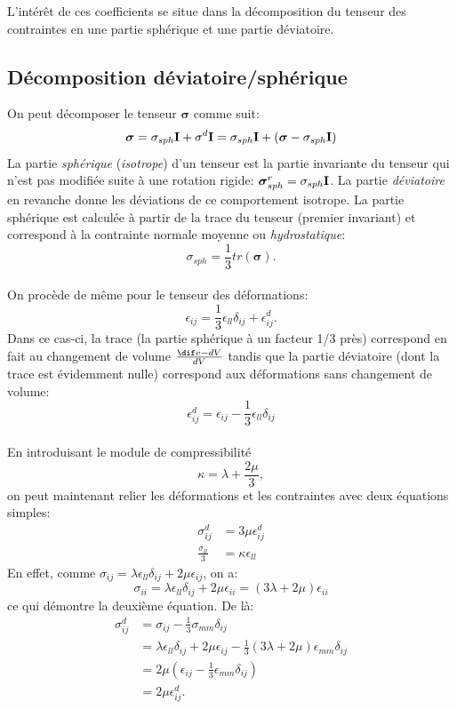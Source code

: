 L'intérêt de ces coefficients se situe dans la décomposition du tenseur des contraintes en une partie sphérique et une partie déviatoire.

\subsection{Décomposition déviatoire/sphérique}
On peut décomposer le tenseur $\boldsymbol{\sigma}$ comme suit:
$$\boldsymbol{\sigma}=\sigma_{sph}\textbf{I}+\sigma^d\textbf{I}=\sigma_{sph}\textbf{I}+(\boldsymbol{\sigma}-\sigma_{sph}\textbf{I})$$
La partie \emph{sphérique} (\emph{isotrope}) d'un tenseur est la partie invariante du tenseur qui n'est pas modifiée suite à une rotation rigide: $\boldsymbol{\sigma}_{sph}^r=\sigma_{sph}\textbf{I}$. La partie \emph{déviatoire} en revanche donne les déviations de ce comportement isotrope.
La partie sphérique est calculée à partir de la trace du tenseur (premier invariant) et correspond à la contrainte normale moyenne ou \emph{hydrostatique}:
$$\sigma_{sph}=\frac{1}{3}tr(\boldsymbol{\sigma}).$$
\paragraph{}
On procède de même pour le tenseur des déformations:
$$\epsilon_{ij}=\frac{1}{3}\epsilon_{ll}\delta_{ij}+\epsilon_{ij}^d.$$ Dans ce cas-ci, la trace (la partie sphérique à un facteur 1/3 près) correspond en fait au changement de volume $\frac{ \dif v-dV}{dV}$ tandis que la partie déviatoire (dont la trace est évidemment nulle) correspond aux déformations sans changement de volume:
$$\epsilon_{ij}^d=\epsilon_{ij}-\frac{1}{3}\epsilon_{ll}\delta_{ij}$$
\paragraph{}
En introduisant le module de compressibilité $$\kappa=\lambda+\frac{2\mu}{3},$$ on peut maintenant relier les déformations et les contraintes avec deux équations simples:
\begin{align}
\label{defo-cont}
\sigma_{ij}^d&=3\mu\epsilon_{ij}^d\\
\frac{\sigma_{ll}}{3}&=\kappa\epsilon_{ll}
\end{align}
En effet, comme $\sigma_{ij}=\lambda\epsilon_{ll}\delta_{ij}+2\mu\epsilon_{ij}$, on a:
$$\sigma_{ii}=\lambda\epsilon_{ll}\delta_{ij}+2\mu\epsilon_{ii}=(3\lambda+2\mu)\epsilon_{ii}$$ ce qui démontre la deuxième équation. De là:
\begin{align*}
\sigma_{ij}^d&=\sigma_{ij}-\frac{1}{3}\sigma_{mm}\delta_{ij}\\
 &=\lambda\epsilon_{ll}\delta_{ij}+2\mu\epsilon_{ij}-\frac{1}{3}(3\lambda+2\mu)\epsilon_{mm}\delta_{ij}\\
 &=2\mu(\epsilon_{ij}-\frac{1}{3}\epsilon_{mm}\delta_{ij})\\
 &=2\mu\epsilon_{ij}^d.\\
\end{align*}

